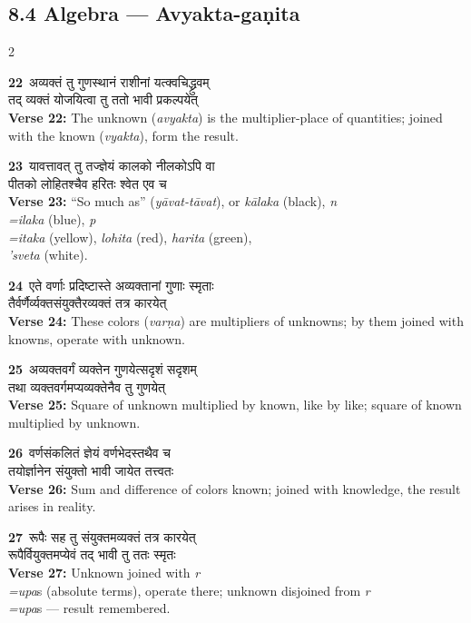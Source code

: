 \documentclass[11pt,a4paper]{article}
\newcommand{\dev}[1]{{\devanagarifont #1}}
\newcommand{\iast}[1]{\textit{#1}}
\newcommand{\vnum}[1]{\textcolor{versenumbercolor}{\textbf{#1}}}
\begin{document}
\subsection*{8.4 Algebra --- Avyakta-ga\d nita}
\label{sec:8.4}

\begin{paracol}{2}

\switchcolumn[0]
\vnum{22}\ \dev{अव्यक्तं तु गुणस्थानं राशीनां यत्क्वचिद्ध्रुवम्}\\
\dev{तद् व्यक्तं योजयित्वा तु ततो भावी प्रकल्पयेत्}\\
\switchcolumn[1]
\textbf{Verse 22:} The unknown (\iast{avyakta}) is the multiplier-place of quantities; joined with the known (\iast{vyakta}), form the result.

\switchcolumn[0]
\vnum{23}\ \dev{यावत्तावत् तु तज्ज्ञेयं कालको नीलकोऽपि वा}\\
\dev{पीतको लोहितश्चैव हरितः श्वेत एव च}\\
\switchcolumn[1]
\textbf{Verse 23:} ``So much as'' (\iast{y\=avat-t\=avat}), or \iast{k\=alaka} (black), \iast{n\\=ilaka} (blue), \iast{p\\=itaka} (yellow), \iast{lohita} (red), \iast{harita} (green), \iast{\\'sveta} (white).

\switchcolumn[0]
\vnum{24}\ \dev{एते वर्णाः प्रदिष्टास्ते अव्यक्तानां गुणाः स्मृताः}\\
\dev{तैर्वर्णैर्व्यक्तसंयुक्तैरव्यक्तं तत्र कारयेत्}\\
\switchcolumn[1]
\textbf{Verse 24:} These colors (\iast{var\d na}) are multipliers of unknowns; by them joined with knowns, operate with unknown.

\switchcolumn[0]
\vnum{25}\ \dev{अव्यक्तवर्गं व्यक्तेन गुणयेत्सदृशं सदृशम्}\\
\dev{तथा व्यक्तवर्गमप्यव्यक्तेनैव तु गुणयेत्}\\
\switchcolumn[1]
\textbf{Verse 25:} Square of unknown multiplied by known, like by like; square of known multiplied by unknown.

\switchcolumn[0]
\vnum{26}\ \dev{वर्णसंकलितं ज्ञेयं वर्णभेदस्तथैव च}\\
\dev{तयोर्ज्ञानेन संयुक्तो भावी जायेत तत्त्वतः}\\
\switchcolumn[1]
\textbf{Verse 26:} Sum and difference of colors known; joined with knowledge, the result arises in reality.

\switchcolumn[0]
\vnum{27}\ \dev{रूपैः सह तु संयुक्तमव्यक्तं तत्र कारयेत्}\\
\dev{रूपैर्वियुक्तमप्येवं तद् भावी तु ततः स्मृतः}\\
\switchcolumn[1]
\textbf{Verse 27:} Unknown joined with \iast{r\\=upa}s (absolute terms), operate there; unknown disjoined from \iast{r\\=upa}s --- result remembered.


\end{paracol}
\end{document}

